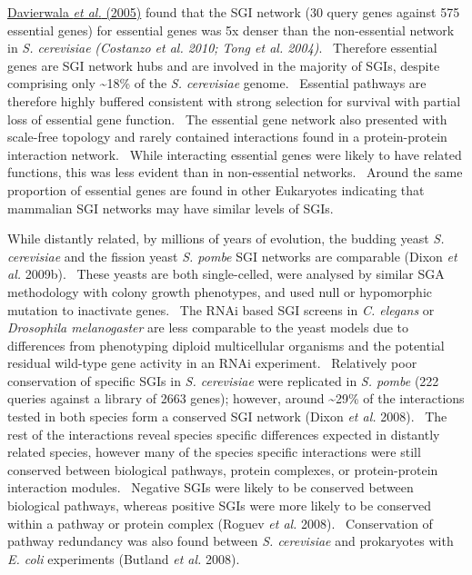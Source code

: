\hyperlink{ENREF28}{Davierwala}\hyperlink{ENREF28}{\textit{ et al.}}\hyperlink{ENREF28}{ (2005)} found that the SGI network (30 query genes against 575 essential genes) for essential genes was 5x denser than the non-essential network in \textit{S. cerevisiae }\textit{(Costanzo et al. 2010; Tong et al. 2004)}. \ Therefore essential genes are SGI network hubs and are involved in the majority of SGIs, despite comprising only \~{}18\% of the \textit{S. cerevisiae} genome. \ Essential pathways are therefore highly buffered consistent with strong selection for survival with partial loss of essential gene function. \ The essential gene network also presented with scale-free topology and rarely contained interactions found in a protein-protein interaction network. \ While interacting essential genes were likely to have related functions, this was less evident than in non-essential networks. \ Around the same proportion of essential genes are found in other Eukaryotes indicating that mammalian SGI networks may have similar levels of SGIs. \  

While distantly related, by millions of years of evolution, the budding yeast \textit{S. cerevisiae} and the fission yeast \textit{S. pombe} SGI networks are comparable (Dixon\textit{ et al.} 2009b). \ These yeasts are both single-celled, were analysed by similar SGA methodology with colony growth phenotypes, and used null or hypomorphic mutation to inactivate genes. \ The RNAi based SGI screens in \textit{C. elegans }or \textit{Drosophila melanogaster} are less comparable to the yeast models due to differences from phenotyping diploid multicellular organisms and the potential residual wild-type gene activity in an RNAi experiment. \ Relatively poor conservation of specific SGIs in \textit{S. cerevisiae} were replicated in \textit{S. pombe} (222 queries against a library of 2663 genes); however, around \~{}29\% of the interactions tested in both species form a conserved SGI network (Dixon\textit{ et al.} 2008). \ The rest of the interactions reveal species specific differences expected in distantly related species, however many of the species specific interactions were still conserved between biological pathways, protein complexes, or protein-protein interaction modules. \ Negative SGIs were likely to be conserved between biological pathways, whereas positive SGIs were more likely to be conserved within a pathway or protein complex (Roguev\textit{ et al.} 2008). \ Conservation of pathway redundancy was also found between \textit{S. cerevisiae} and prokaryotes with \textit{E. coli} experiments (Butland\textit{ et al.} 2008). \

